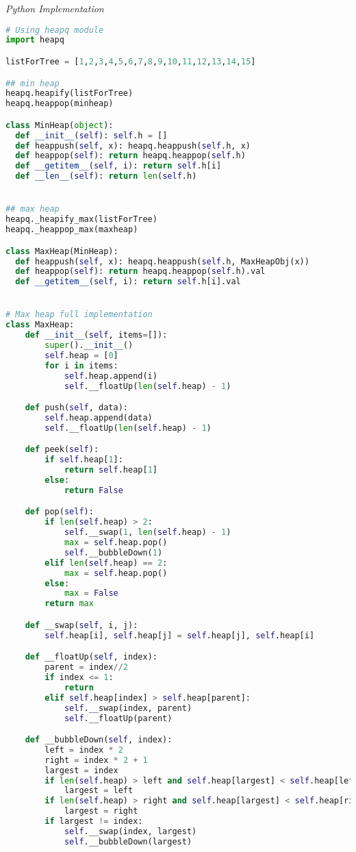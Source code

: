 \documentclass{article}
\begin{document}
\vspace{8pt} \emph{Python Implementation}
\begin{lstlisting}[language=Python]
# Using heapq module
import heapq

listForTree = [1,2,3,4,5,6,7,8,9,10,11,12,13,14,15]    

## min heap
heapq.heapify(listForTree)            
heapq.heappop(minheap)      

class MinHeap(object):
  def __init__(self): self.h = []
  def heappush(self, x): heapq.heappush(self.h, x)
  def heappop(self): return heapq.heappop(self.h)
  def __getitem__(self, i): return self.h[i]
  def __len__(self): return len(self.h)


## max heap
heapq._heapify_max(listForTree)       
heapq._heappop_max(maxheap) 

class MaxHeap(MinHeap):
  def heappush(self, x): heapq.heappush(self.h, MaxHeapObj(x))
  def heappop(self): return heapq.heappop(self.h).val
  def __getitem__(self, i): return self.h[i].val


# Max heap full implementation
class MaxHeap:
    def __init__(self, items=[]):
        super().__init__()
        self.heap = [0]
        for i in items:
            self.heap.append(i)
            self.__floatUp(len(self.heap) - 1)

    def push(self, data):
        self.heap.append(data)
        self.__floatUp(len(self.heap) - 1)

    def peek(self):
        if self.heap[1]:
            return self.heap[1]
        else:
            return False

    def pop(self):
        if len(self.heap) > 2:
            self.__swap(1, len(self.heap) - 1)
            max = self.heap.pop()
            self.__bubbleDown(1)
        elif len(self.heap) == 2:
            max = self.heap.pop()
        else:
            max = False
        return max

    def __swap(self, i, j):
        self.heap[i], self.heap[j] = self.heap[j], self.heap[i]

    def __floatUp(self, index):
        parent = index//2
        if index <= 1:
            return
        elif self.heap[index] > self.heap[parent]:
            self.__swap(index, parent)
            self.__floatUp(parent)

    def __bubbleDown(self, index):
        left = index * 2
        right = index * 2 + 1
        largest = index
        if len(self.heap) > left and self.heap[largest] < self.heap[left]:
            largest = left
        if len(self.heap) > right and self.heap[largest] < self.heap[right]:
            largest = right
        if largest != index:
            self.__swap(index, largest)
            self.__bubbleDown(largest)

\end{lstlisting}
\end{document}
